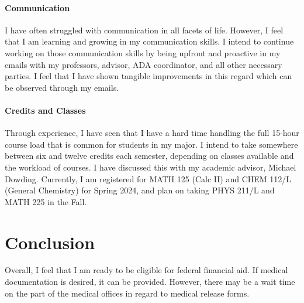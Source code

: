 \documentclass[12pt]{article}
\begin{document}
\paragraph{Communication}
I have often struggled with communication in all facets of life. 
However, I feel that I am learning and growing in my communication skills.
I intend to continue working on those communication skills by being upfront and 
proactive in my emails with my professors, advisor, ADA coordinator, and all other 
necessary parties.
I feel that I have shown tangible improvements in this regard which can be observed
through my emails.

\paragraph{Credits and Classes}
Through experience, I have seen that I have a hard time handling the full 
15-hour course load that is common for students in my major.
I intend to take somewhere between six and twelve credits each semester, depending
on classes available and the workload of courses.
I have discussed this with my academic advisor, Michael Dowding.
Currently, I am registered for MATH 125 (Calc II) and CHEM 112/L 
(General Chemistry) for Spring 2024, and plan on taking PHYS 211/L and MATH 225
in the Fall.




\section*{Conclusion}
Overall, I feel that I am ready to be eligible for federal financial aid.
If medical documentation is desired, it can be provided.
However, there may be a wait time on the part of the medical offices
in regard to medical release forms.
\end{document}
